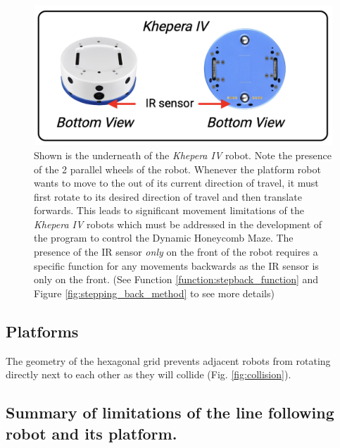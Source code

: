 \begin{figure}[h]
    \centering
    \includegraphics[scale = 0.5]{images/kiv_view.png}
    \caption{Shown is the underneath of the \textit{Khepera IV} robot. Note the presence of the 2 parallel wheels of the robot. 
    Whenever the platform robot wants to move to the out of its current direction of travel, it must first rotate to its desired direction of travel and then translate forwards.
    This leads to significant movement limitations of the \textit{Khepera IV} robots which must be addressed in the development of the program to control the Dynamic Honeycomb Maze.
    The presence of the IR sensor \textit{only} on the front of the robot requires a specific function for any movements backwards as the IR sensor is only on the front. (See Function \ref{function:stepback_function} and Figure \ref{fig:stepping_back_method} to see more details)
    }
    \label{fig:robot}
\end{figure}

\subsection{Platforms}


The geometry of the hexagonal grid prevents adjacent robots from rotating directly next to each other as they will collide (Fig. \ref{fig:collision}).

\subsection{Summary of limitations of the line following robot and its platform.} 

